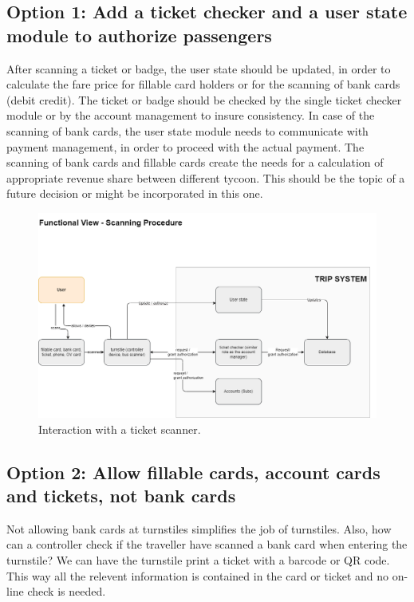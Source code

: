 \subsection*{Option 1: Add a ticket checker and a user state module to authorize passengers}
After scanning a ticket or badge, the user state should be updated, in order to calculate the fare price for fillable card holders or for the scanning of bank cards (debit credit).
The ticket or badge should be checked by the single ticket checker module or by the account management to insure consistency.
In case of the scanning of bank cards, the user state module needs to communicate with payment management, in order to proceed with the actual payment.
The scanning of bank cards and fillable cards create the needs for a calculation of appropriate revenue share between different tycoon. This should be the topic of a future decision or might be incorporated in this one.
\begin{figure}[ht]
    \centering
    \includegraphics[width=\textwidth]{drawings/views_draft2/functional_view turnstiles.png}
    \caption{Interaction with a ticket scanner.}
    \label{fig:ticket_scanner}
\end{figure}

\subsection*{Option 2: Allow fillable cards, account cards and tickets, not bank cards}
Not allowing bank cards at turnstiles simplifies the job of turnstiles.
Also, how can a controller check if the traveller have scanned a bank card when entering the turnstile?
We can have the turnstile print a ticket with a barcode or QR code.
This way all the relevent information is contained in the card or ticket and no on-line check is needed. 

